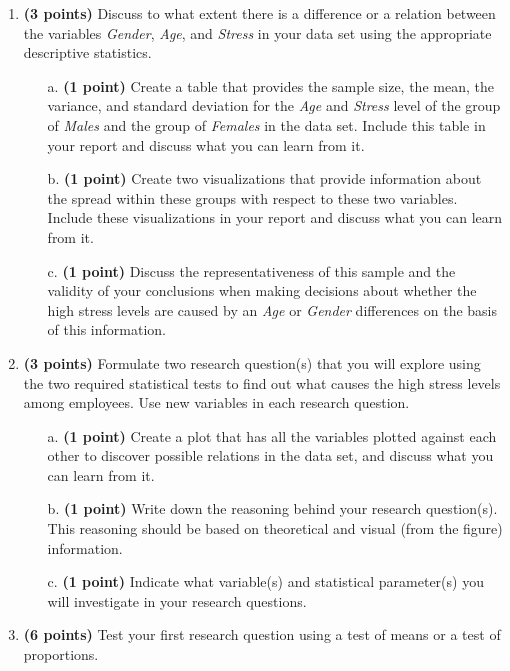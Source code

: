 {\begin{enumerate}
    \item \textbf{(3 points)} Discuss to what extent there is a difference or a relation between the variables \textit{Gender}, \textit{Age}, and \textit{Stress} in your data set using the appropriate descriptive statistics. 
    \begin{itemize}
        \item[a.] \textbf{(1 point)} Create a table that provides the sample size, the mean, the variance, and standard deviation for the \textit{Age} and \textit{Stress} level of the group of \textit{Males} and the group of \textit{Females} in the data set. Include this table in your report and discuss what you can learn from it. 
        \item[b.] \textbf{(1 point)} Create two visualizations that provide information about the spread within these groups with respect to these two variables. Include these visualizations in your report and discuss what you can learn from it.  
        \item[c.] \textbf{(1 point)} Discuss the representativeness of this sample and the validity of your conclusions when making decisions about whether the high stress levels are caused by an \textit{Age} or \textit{Gender} differences on the basis of this information.
    \end{itemize}
    \item \textbf{(3 points)} Formulate two research question(s) that you will explore using the two required statistical tests to find out what causes the high stress levels among employees. Use new variables in each research question.
    \begin{itemize}
        \item[a.] \textbf{(1 point)} Create a plot that has all the variables plotted against each other to discover possible relations in the data set, and discuss what you can learn from it.
        \item[b.] \textbf{(1 point)} Write down the reasoning behind your research question(s). This reasoning should be based on theoretical and visual (from the figure) information.
        \item[c.] \textbf{(1 point)} Indicate what variable(s) and statistical parameter(s) you will investigate in your research questions.
    \end{itemize}
    \item \textbf{(6 points)} Test your first research question using a test of means or a test of proportions.

\end{enumerate}}
